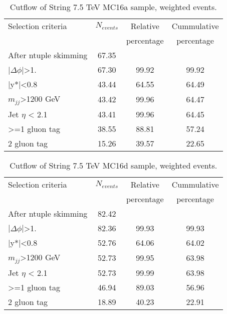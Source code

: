 \begin{table}[ht]
\begin{center}
\begin{tabular}{|l|c|c|c|}
\hline
Selection criteria & $N_{events}$ & Relative & Cummulative \\
 & & percentage & percentage \\
\hline
After ntuple skimming & 67.35 &  &  \\
$|\Delta\phi|$>1. & 67.30 & 99.92 & 99.92 \\
|y*|<0.8 & 43.44 & 64.55 & 64.49 \\
$m_{jj}$>1200 GeV & 43.42 & 99.96 & 64.47 \\
Jet $\eta$ < 2.1 & 43.41 & 99.96 & 64.45 \\
>=1 gluon tag & 38.55 & 88.81 & 57.24 \\
2 gluon tag & 15.26 & 39.57 & 22.65 \\
\hline
\end{tabular}
\end{center}
\caption{Cutflow of String 7.5 TeV MC16a sample, weighted events.}
\label{tab:String7p5MC16a}
\end{table}

\begin{table}[ht]
\begin{center}
\begin{tabular}{|l|c|c|c|}
\hline
Selection criteria & $N_{events}$ & Relative & Cummulative \\
 & & percentage & percentage \\
\hline
After ntuple skimming & 82.42 &  &  \\
$|\Delta\phi|$>1. & 82.36 & 99.93 & 99.93 \\
|y*|<0.8 & 52.76 & 64.06 & 64.02 \\
$m_{jj}$>1200 GeV & 52.73 & 99.95 & 63.98 \\
Jet $\eta$ < 2.1 & 52.73 & 99.99 & 63.98 \\
>=1 gluon tag & 46.94 & 89.03 & 56.96 \\
2 gluon tag & 18.89 & 40.23 & 22.91 \\
\hline
\end{tabular}
\end{center}
\caption{Cutflow of String 7.5 TeV MC16d sample, weighted events.}
\label{tab:String7p5MC16d}
\end{table}

